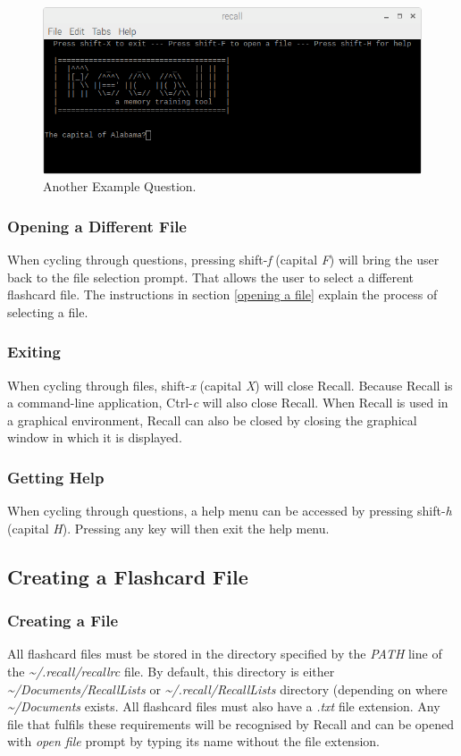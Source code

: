 \documentclass[letterpaper]{article}
\begin{document}
\begin{figure}[H]
  \centering
  \includegraphics[width=14cm]{images/running/questian2.png}
  \caption{Another Example Question.}
  \label{fig:example_questian_2}
\end{figure}

\subsubsection{Opening a Different File}
When cycling through questions, pressing shift-\textit{f} (capital \textit{F}) will bring the user back to the file selection prompt. That allows the user to select a different flashcard file. The instructions in section \ref{opening a file} explain the process of selecting a file.

\subsubsection{Exiting}
When cycling through files, shift-\textit{x} (capital \textit{X}) will close Recall. Because Recall is a command-line application, Ctrl-\textit{c} will also close Recall. When Recall is used in a graphical environment, Recall can also be closed by closing the graphical window in which it is displayed.

\subsubsection{Getting Help}
When cycling through questions, a help menu can be accessed by pressing shift-\textit{h} (capital \textit{H}). Pressing any key will then exit the help menu.

\subsection{Creating a Flashcard File}
\subsubsection{Creating a File}
All flashcard files must be stored in the directory specified by the \textit{PATH} line of the \textit{\~{}/.recall/recallrc} file. By default, this directory is either \textit{\~{}/Documents/RecallLists} or \textit{\~{}/.recall/RecallLists} directory (depending on where \textit{\~{}/Documents} exists. All flashcard files must also have a \textit{.txt} file extension. Any file that fulfils these requirements will be recognised by Recall and can be opened with \textit{open file} prompt by typing its name without the file extension.
\end{document}
